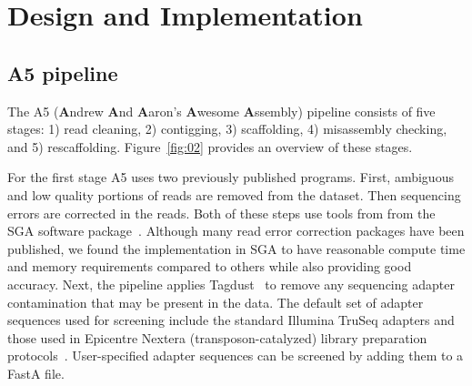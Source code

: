 \documentclass[10pt]{article}
\begin{document}
\section*{Design and Implementation}

\subsection*{A5 pipeline}

The A5 (\textbf{A}ndrew \textbf{A}nd \textbf{A}aron's \textbf{A}wesome \textbf{A}ssembly) pipeline consists of five 
stages: 1) read cleaning, 2) contigging, 3) scaffolding, 4) misassembly checking, and 5) rescaffolding. 
Figure~\ref{fig:02} provides an overview of these stages. 

For the first stage A5 uses two previously published programs. First, 
ambiguous and low quality portions of reads are removed from the dataset. Then sequencing errors are corrected in the reads. Both of these 
steps use tools from from the SGA software package~\cite{Simpson2010}.  Although many read error correction packages have been published,
we found the implementation in SGA to have reasonable compute time and memory requirements compared to others while also providing 
good accuracy.  Next, the pipeline applies Tagdust~\cite{Lassmann2009} to remove any 
sequencing adapter contamination that may be present in the data. The default set of adapter sequences used for screening
include the standard Illumina TruSeq adapters and those used in Epicentre Nextera (transposon-catalyzed) library preparation protocols~\cite{Adey2010}. 
User-specified adapter sequences can be screened by adding them to a FastA file. 
\end{document}
